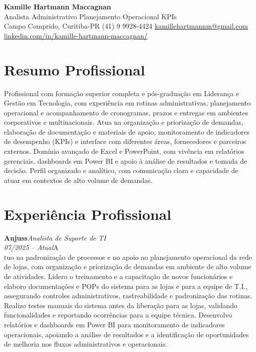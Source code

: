 \documentclass[11pt,a4paper]{article}
\newcommand{\cvrole}[4]{%
  \vspace{4pt}%
  {\bfseries\color{accentcolor}#1}\hfill{\itshape #2}\\[-2pt]%
  {\itshape #3}\hfill #4\\[6pt]%
}
\begin{document}
\begin{center}
  {\fontsize{20}{24}\selectfont\bfseries Kamille Hartmann Maccagnan}\\[8pt]
  {\large Analista Administrativo \textbar{} Planejamento Operacional \textbar{} KPIs}\\[10pt]
  Campo Comprido, Curitiba-PR \enspace\textbullet\enspace (41) 9 9928-4424 \enspace\textbullet\enspace
  \href{mailto:kamillehartmannm@gmail.com}{kamillehartmannm@gmail.com}\\[3pt]
  \href{https://linkedin.com/in/kamille-hartmann-maccagnan/}{linkedin.com/in/kamille-hartmann-maccagnan/}
\end{center}

\vspace{6pt}

\section{Resumo Profissional}

Profissional com formação superior completa e pós-graduação em Liderança e Gestão em Tecnologia, com experiência em rotinas administrativas, planejamento operacional e acompanhamento de cronogramas, prazos e entregas em ambientes corporativos e multinacionais. Atua na organização e priorização de demandas, elaboração de documentação e materiais de apoio, monitoramento de indicadores de desempenho (KPIs) e interface com diferentes áreas, fornecedores e parceiros externos. Domínio avançado de Excel e PowerPoint, com vivência em relatórios gerenciais, dashboards em Power BI e apoio à análise de resultados e tomada de decisão. Perfil organizado e analítico, com comunicação clara e capacidade de atuar em contextos de alto volume de demandas.

\section{Experiência Profissional}

\cvrole{Anjuss}{Analista de Suporte de TI}{07/2025 -- Atual}

Atuo na padronização de processos e no apoio ao planejamento operacional da rede de lojas, com organização e priorização de demandas em ambiente de alto volume de atividades. Lidero o treinamento e a capacitação de novos funcionários e elaboro documentações e POPs do sistema para as lojas e para a equipe de T.I., assegurando controles administrativos, rastreabilidade e padronização das rotinas. Realizo testes manuais do sistema antes da liberação para as lojas, validando funcionalidades e reportando ocorrências para a equipe técnica. Desenvolvo relatórios e dashboards em Power BI para monitoramento de indicadores operacionais, apoiando a análise de resultados e a identificação de oportunidades de melhoria nos fluxos administrativos e operacionais.
\end{document}
